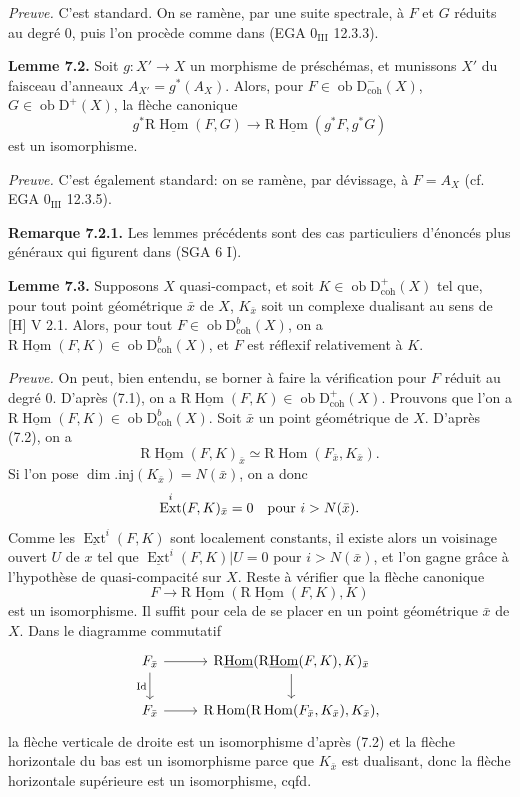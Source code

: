 \documentclass[11pt]{article}
\DeclareMathOperator{\Hom}{Hom}
\DeclareMathOperator{\Ext}{Ext}
\newcommand{\R}{\mathrm{R}}
\newcommand{\D}{\mathrm{D}}
\newcommand{\ob}{\operatorname{ob}}
\providecommand{\Hom}{\operatorname{Hom}}
\providecommand{\ob}{\operatorname{ob}}
\providecommand{\R}{\mathrm R}
\providecommand{\Hom}{\operatorname{Hom}}
\begin{document}
\emph{Preuve.} C'est standard. On se ramène, par une suite spectrale, à $F$ et $G$ réduits au degré $0$, puis l'on procède comme dans (EGA $0_{\mathrm{III}}$ 12.3.3).

\textbf{Lemme 7.2.} Soit $g:X'\to X$ un morphisme de préschémas, et munissons $X'$ du faisceau d'anneaux $A_{X'}=g^*(A_X)$. Alors, pour $F\in\ob\D^{-}_{\mathrm{coh}}(X)$, $G\in\ob\D^{+}(X)$, la flèche canonique
\[
        g^*\R\underline{\Hom}(F,G)\longrightarrow \R\underline{\Hom}(g^*F,g^*G)
\]
est un isomorphisme.

\emph{Preuve.} C'est également standard: on se ramène, par dévissage, à $F=A_X$ (cf. EGA $0_{\mathrm{III}}$ 12.3.5).

\textbf{Remarque 7.2.1.} Les lemmes précédents sont des cas particuliers d'énoncés plus généraux qui figurent dans (SGA 6 I).

\textbf{Lemme 7.3.} Supposons $X$ quasi-compact, et soit $K\in\ob\D^{+}_{\mathrm{coh}}(X)$ tel que, pour tout point géométrique $\bar{x}$ de $X$, $K_{\bar{x}}$ soit un complexe dualisant au sens de [H] V 2.1. Alors, pour tout $F\in\ob\D^{b}_{\mathrm{coh}}(X)$, on a $\R\underline{\Hom}(F,K)\in\ob\D^{b}_{\mathrm{coh}}(X)$, et $F$ est réflexif relativement à $K$.

\emph{Preuve.} On peut, bien entendu, se borner à faire la vérification pour $F$ réduit au degré $0$. D'après (7.1), on a $\R\underline{\Hom}(F,K)\in\ob\D^{+}_{\mathrm{coh}}(X)$. Prouvons que l'on a $\R\underline{\Hom}(F,K)\in\ob\D^{b}_{\mathrm{coh}}(X)$. Soit $\bar{x}$ un point géométrique de $X$. D'après (7.2), on a
\[
        \R\underline{\Hom}(F,K)_{\bar{x}}\simeq \R\Hom(F_{\bar{x}},K_{\bar{x}}).
\]
Si l'on pose $\dim.\mathrm{inj}(K_{\bar{x}})=N(\bar{x})$, on a donc
\[
        \Ext^i(F,K)_{\bar{x}}=0\quad\hbox{pour }i>N(\bar{x}).
\]
Comme les $\underline{\Ext}^{i}(F,K)$ sont localement constants, il existe alors un voisinage ouvert $U$ de $x$ tel que $\underline{\Ext}^{i}(F,K)|U=0$ pour $i>N(\bar{x})$, et l'on gagne grâce à l'hypothèse de quasi-compacité sur $X$. Reste à vérifier que la flèche canonique
\[
        F\longrightarrow \R\underline{\Hom}(\R\underline{\Hom}(F,K),K)
\]
est un isomorphisme. Il suffit pour cela de se placer en un point géométrique $\bar{x}$ de $X$. Dans le diagramme commutatif
\[
\begin{tikzcd}
F_{\bar{x}} \arrow[r] \arrow[d,"\mathrm{Id}"'] & \R\underline{\Hom}(\R\underline{\Hom}(F,K),K)_{\bar{x}} \arrow[d]\\
F_{\bar{x}} \arrow[r] & \R\Hom(\R\Hom(F_{\bar{x}},K_{\bar{x}}),K_{\bar{x}}),
\end{tikzcd}
\]
la flèche verticale de droite est un isomorphisme d'après (7.2) et la flèche horizontale du bas est un isomorphisme parce que $K_{\bar{x}}$ est dualisant, donc la flèche horizontale supérieure est un isomorphisme, cqfd.
\end{document}
